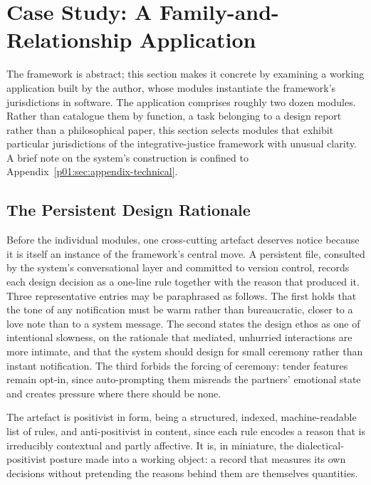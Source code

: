 \section{Case Study: A Family-and-Relationship Application}\label{p01:sec:casestudy}

The framework is abstract; this section makes it concrete by examining a working application built by the author, whose modules instantiate the framework's jurisdictions in software. The application comprises roughly two dozen modules. Rather than catalogue them by function, a task belonging to a design report rather than a philosophical paper, this section selects modules that exhibit particular jurisdictions of the integrative-justice framework with unusual clarity. A brief note on the system's construction is confined to Appendix~\ref{p01:sec:appendix-technical}.

\subsection{The Persistent Design Rationale}\label{p01:sec:memory}

Before the individual modules, one cross-cutting artefact deserves notice because it is itself an instance of the framework's central move. A persistent file, consulted by the system's conversational layer and committed to version control, records each design decision as a one-line rule together with the reason that produced it. Three representative entries may be paraphrased as follows. The first holds that the tone of any notification must be warm rather than bureaucratic, closer to a love note than to a system message. The second states the design ethos as one of intentional slowness, on the rationale that mediated, unhurried interactions are more intimate, and that the system should design for small ceremony rather than instant notification. The third forbids the forcing of ceremony: tender features remain opt-in, since auto-prompting them misreads the partners' emotional state and creates pressure where there should be none.

\noindent The artefact is positivist in form, being a structured, indexed, machine-readable list of rules, and anti-positivist in content, since each rule encodes a reason that is irreducibly contextual and partly affective. It is, in miniature, the dialectical-positivist posture made into a working object: a record that measures its own decisions without pretending the reasons behind them are themselves quantities.

